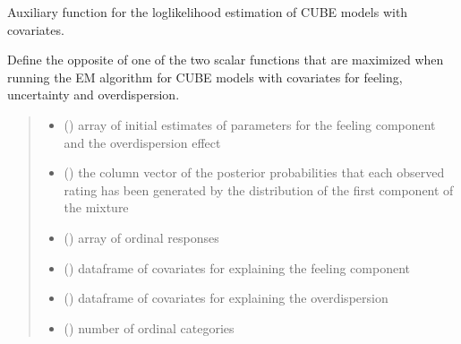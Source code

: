 \documentclass[letterpaper,10pt,english]{sphinxmanual}
\begin{document}
\begin{fulllineitems}
\label{\detokenize{cubmods:cubmods.cube_ywz.Qdue}}
\pysigstartsignatures
{}
\pysigstopsignatures
\sphinxAtStartPar
Auxiliary function for the log\sphinxhyphen{}likelihood estimation of CUBE models with covariates.

\sphinxAtStartPar
Define the opposite of one of the two scalar functions that are maximized when running the E\sphinxhyphen{}M 
algorithm for CUBE models with covariates for feeling, uncertainty and overdispersion.
\begin{quote}\begin{description}
\begin{itemize}
\item {} 
\sphinxAtStartPar
{} () \textendash{} array of initial estimates of parameters for the feeling component and the overdispersion effect

\item {} 
\sphinxAtStartPar
{} () \textendash{} the column vector of the posterior probabilities that each observed rating
has been generated by the distribution of the first component of the mixture

\item {} 
\sphinxAtStartPar
{} () \textendash{} array of ordinal responses

\item {} 
\sphinxAtStartPar
{} () \textendash{} dataframe of covariates for explaining the feeling component

\item {} 
\sphinxAtStartPar
{} () \textendash{} dataframe of covariates for explaining the overdispersion

\item {} 
\sphinxAtStartPar
{} () \textendash{} number of ordinal categories

\end{itemize}

\end{description}\end{quote}

\end{fulllineitems}
\end{document}
